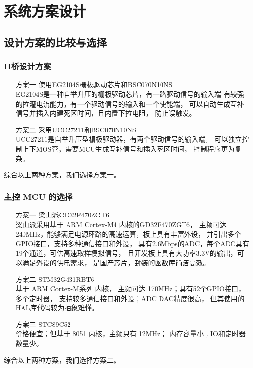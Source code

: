 \documentclass[a4paper,12pt]{article}
\begin{document}
\section{系统方案设计}
\subsection{设计方案的比较与选择}

\subsubsection{H桥设计方案}
\begin{enumerate}
    \item[方案一] 使用EG2104S栅极驱动芯片和BSC070N10NS
    \\ 
    EG2104S是一种自举升压的栅极驱动芯片，有一路驱动信号的输入端
    有较强的拉灌电流能力，有一个驱动信号的输入和一个使能端，
    可以自动生成互补信号并插入内建死区时间，且内置下拉电阻，
    防止误触发。
    \item[方案二] 采用UCC27211和BSC070N10NS
    \\ 
    UCC27211是自举升压型栅极驱动器，有两个驱动信号的输入端，
    可以独立控制上下MOS管，需要MCU生成互补信号和插入死区时间，
    控制程序更为复杂。
\end{enumerate}
综合以上两种方案，我们选择方案一。

\subsubsection{主控 MCU 的选择}
\begin{enumerate}
    \item[方案一] 梁山派GD32F470ZGT6 
    \\
    梁山派采用基于 ARM Cortex-M4 内核的GD32F470ZGT6，
    主频可达240MHz，能够满足电源环路的高速运算，板上具有丰富外设，
    并引出多个GPIO接口，支持多种通信接口和外设，
    具有2.6Mbps的ADC，每个ADC具有19个通道，可供高速取样模拟信号，
    且开发板上具有大功率3.3V的输出，可以满足外设的供电需求，
    是国产芯片，封装的函数库简洁高效。
    \item[方案二] STM32G431RBT6 
    \\ 
    基于 ARM Cortex-M系列 内核，
    主频可达 170MHz；具有52个GPIO接口，多个定时器，
    支持较多通信接口和外设；ADC DAC精度很高，
    但其使用的HAL库代码较为抽象难懂。    
    \item[方案三] STC89C52 
    \\ 
    价格便宜；但基于 8051 内核，主频只有 12MHz；
    内存容量小；IO和定时器数量少。
\end{enumerate}
综合以上两种方案，我们选择方案二。
\end{document}

